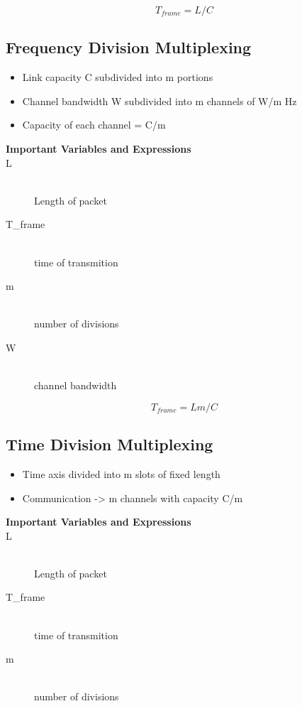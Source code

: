 \documentclass[../resumosRCOM.tex]{subfiles}
\begin{document}
\begin{equation}
    T_{frame} = L/C
\end{equation}

\subsection{Frequency Division Multiplexing}

\begin{itemize}
    \item Link capacity C subdivided into m portions
    \item Channel bandwidth W subdivided into m channels of W/m Hz
    \item Capacity of each channel = C/m
\end{itemize}

\begin{description}
    \item [\textbf{Important Variables and Expressions}]
    \item[L] \hfill \\ Length of packet
    \item[T_{frame}] \hfill \\ time of transmition
    \item[m] \hfill \\ number of divisions
    \item[W] \hfill \\ channel bandwidth
\end{description}

\begin{equation}
    T_{frame} = Lm/C
\end{equation}

\subsection{Time Division Multiplexing}

\begin{itemize}
    \item Time axis divided into m slots of fixed length
    \item Communication -> m channels with capacity C/m
\end{itemize}

\begin{description}
    \item [\textbf{Important Variables and Expressions}]
    \item[L] \hfill \\ Length of packet
    \item[T_{frame}] \hfill \\ time of transmition
    \item[m] \hfill \\ number of divisions
\end{description}
\end{document}
